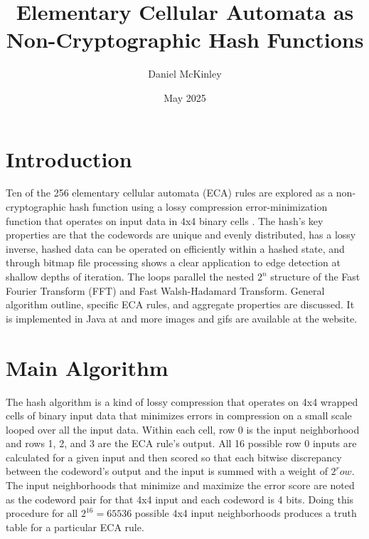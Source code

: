 \documentclass[11pt]{article}
\title{Elementary Cellular Automata as Non-Cryptographic Hash Functions}
\date{May 2025}
\author{Daniel McKinley}
\begin{document}
\maketitle

\section{Introduction}

Ten of the 256 elementary cellular automata (ECA) rules are explored as a non-cryptographic hash function using a lossy compression error-minimization function that operates on input data in 4x4 binary cells \cite{Wolfram}. The hash's key properties are that the codewords are unique and evenly distributed, has a lossy inverse, hashed data can be operated on efficiently within a hashed state, and through bitmap file processing shows a clear application to edge detection at shallow depths of iteration.  The loops parallel the nested $2^n$ structure of the Fast Fourier Transform (FFT) and Fast Walsh-Hadamard Transform. General algorithm outline, specific ECA rules, and aggregate properties are discussed. It is implemented in Java at \cite{mygit} and more images and gifs are available at the website.\\

\section{Main Algorithm}
The hash algorithm is a kind of lossy compression that operates on 4x4 wrapped cells of binary input data that minimizes errors in compression on a small scale looped over all the input data. Within each cell, row 0 is the input neighborhood and rows 1, 2, and 3 are the ECA rule's output. All 16 possible row 0 inputs are calculated for a given input and then scored so that each bitwise discrepancy between the codeword's output and the input is summed with a weight of $2^row$. The input neighborhoods that minimize and maximize the error score are noted as the codeword pair for that 4x4 input and each codeword is 4 bits. Doing this procedure for all  $2^{16}=65536$ possible 4x4 input neighborhoods produces a truth table for a particular ECA rule.\\
\end{document}
